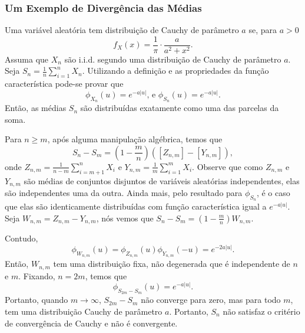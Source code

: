 \begin{frame}
\frametitle{\textbf{Um Exemplo de Divergência das Médias}}

Uma variável aleatória tem distribuição de Cauchy de parâmetro $a$
se, para $a>0$
$$f_X(x)=\frac{1}{\pi}\cdot\frac{a}{a^2+x^2}.$$
%
Assuma que $X_n$ são i.i.d. segundo uma distribuição de Cauchy de
parâmetro $a$. Seja $S_n=\frac{1}{n}\sum_{i=1}^{n}X_n$. Utilizando a
definição e as propriedades da função característica pode-se provar que
$$\phi_{X_n}(u)=e^{-a|u|}\mbox{, e }\phi_{S_n}(u)=e^{-a|u|}.$$
Então, as médias $S_n$ são distribuídas exatamente como uma das
parcelas da soma.

%


Para $n\geq m$, após alguma manipulação algébrica,
temos que
$$S_n-S_m=(1-\frac{m}{n})([Z_{n,m}]-[Y_{n,m}]),$$
onde $Z_{n,m}=\frac{1}{n-m}\sum_{i=m+1}^{n}X_i$ e
$Y_{n,m}=\frac{1}{m}\sum_{i=1}^{m}X_i$. Observe que como $Z_{n,m}$ e
$Y_{n,m}$ são médias de conjuntos disjuntos de variáveis aleatórias
independentes, elas são independentes uma da outra. Ainda mais, pelo
resultado para $\phi_{S_n}$, é o caso que elas são identicamente
distribuídas com função característica igual a $e^{-a|u|}$. Seja
$W_{n,m}=Z_{n,m}-Y_{n,m}$, nós vemos que
$S_{n}-S_m=(1-\frac{m}{n})W_{n,m}$.


\end{frame}

\begin{frame}


Contudo,
$$\phi_{W_{n,m}}(u)=\phi_{Z_{n,m}}(u)\phi_{Y_{n,m}}(-u)=e^{-2a|u|}.$$
Então, $W_{n,m}$ tem uma distribuição fixa, não degenerada que é
independente de $n$ e $m$. Fixando, $n=2m$, temos que
$$\phi_{S_{2m}-S_m}(u)=e^{-a|u|}.$$
Portanto, quando $m\rightarrow\infty$, $S_{2m}-S_m$ não converge
para zero, mas para todo $m$, tem uma distribuição Cauchy de
parâmetro $a$. Portanto, $S_n$ não satisfaz o critério de
convergência de Cauchy e não é convergente.

\end{frame}

